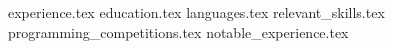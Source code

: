 \documentclass[11pt, a4papter]{awesome-cv}
\newcommand*{\sectiondir}{sections/}
\begin{document}
\makecvheader

{experience.tex}
{education.tex}
{languages.tex}
{relevant_skills.tex}
{programming_competitions.tex}
{notable_experience.tex}
\end{document}
